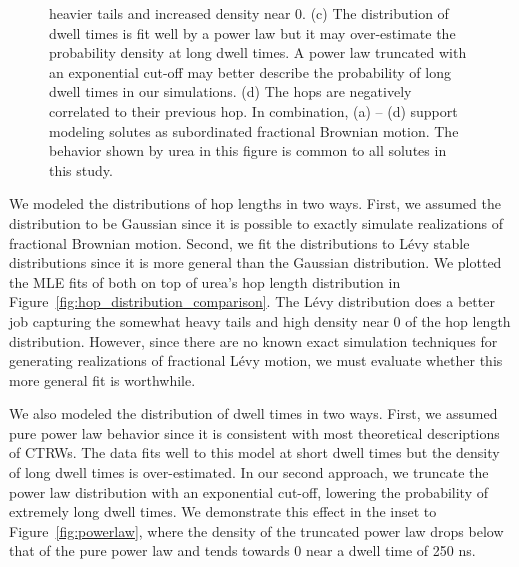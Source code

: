\documentclass{article}
\begin{document}
\begin{figure}
{  heavier tails and increased density near 0. (c) The distribution of dwell times is fit
  well by a power law but it may over-estimate the probability density at long dwell times.
  A power law truncated with an exponential cut-off may better describe the probability of
  long dwell times in our simulations. (d) The hops are negatively correlated to their previous
  hop. In combination, (a) -- (d) support modeling solutes as subordinated fractional Brownian
  motion. The behavior shown by urea in this figure is common to all solutes in this study.}\label{fig:anticorrelated_hops}
  \end{figure}
  
  We modeled the distributions of hop lengths in two ways. First, we assumed the 
  distribution to be Gaussian since it is possible to exactly simulate realizations of
  fractional Brownian motion. Second, we fit the distributions to L\'evy stable 
  distributions since it is more general than the Gaussian distribution. We plotted
  the MLE fits of both on top of urea's hop length distribution in 
  Figure~\ref{fig:hop_distribution_comparison}. The L\'evy distribution does a better
  job capturing the somewhat heavy tails and high density near 0 of the hop length distribution.
  However, since there are no known exact simulation techniques for generating 
  realizations of fractional L\'evy motion, we must evaluate whether this more general
  fit is worthwhile. 
  
  We also modeled the distribution of dwell times in two ways. First, we assumed pure
  power law behavior since it is consistent with most theoretical descriptions of CTRWs.
  The data fits well to this model at short dwell times but the density of long dwell
  times is over-estimated. In our second approach, we truncate the power law distribution
  with an exponential cut-off, lowering the probability of extremely long dwell times. 
  We demonstrate this effect in the inset to Figure~\ref{fig:powerlaw}, where the
  density of the truncated power law drops below that of the pure power law and tends towards
  0 near a dwell time of 250 ns.
  
\end{document}
